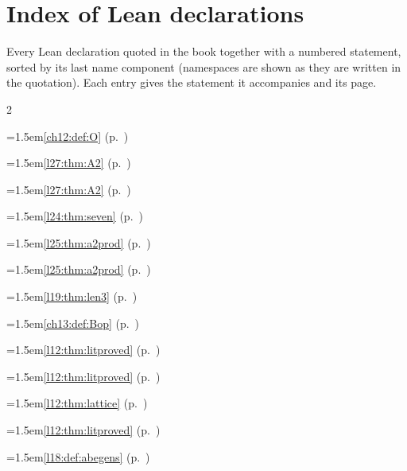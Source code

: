 \chapter{Index of Lean declarations}\label{ch:declindex}
Every Lean declaration quoted in the book together with a numbered statement, sorted by its last name component (namespaces are shown as they are written in the quotation). Each entry gives the statement it accompanies and its page.
\begingroup\small\setlength{\parindent}{0pt}\raggedright
\setlength{\columnsep}{1.5em}\begin{multicols}{2}
\par{}\par\nopagebreak\smallskip
\hangindent=1.5em\quad \ref{ch12:def:O} (p.~\pageref{ch12:def:O})\par
\hangindent=1.5em\quad \ref{l27:thm:A2} (p.~\pageref{l27:thm:A2})\par
\hangindent=1.5em\quad \ref{l27:thm:A2} (p.~\pageref{l27:thm:A2})\par
\hangindent=1.5em\quad \ref{l24:thm:seven} (p.~\pageref{l24:thm:seven})\par
\hangindent=1.5em\quad \ref{l25:thm:a2prod} (p.~\pageref{l25:thm:a2prod})\par
\hangindent=1.5em\quad \ref{l25:thm:a2prod} (p.~\pageref{l25:thm:a2prod})\par
\hangindent=1.5em\quad \ref{l19:thm:len3} (p.~\pageref{l19:thm:len3})\par
\hangindent=1.5em\quad \ref{ch13:def:Bop} (p.~\pageref{ch13:def:Bop})\par
\hangindent=1.5em\quad \ref{l12:thm:litproved} (p.~\pageref{l12:thm:litproved})\par
\hangindent=1.5em\quad \ref{l12:thm:litproved} (p.~\pageref{l12:thm:litproved})\par
\hangindent=1.5em\quad \ref{l12:thm:lattice} (p.~\pageref{l12:thm:lattice})\par
\hangindent=1.5em\quad \ref{l12:thm:litproved} (p.~\pageref{l12:thm:litproved})\par
\hangindent=1.5em\quad \ref{l18:def:abegens} (p.~\pageref{l18:def:abegens})\par

\end{multicols}
